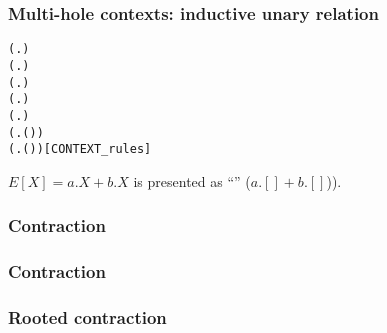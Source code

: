 \begin{frame}[fragile]
\frametitle{Multi-hole contexts: inductive unary relation}
\vspace{-2ex}
\begin{definition}
\begin{alltt}
 (\HOLTokenLambda{}. )
 (\HOLTokenLambda{}. )
  \HOLSymConst{\HOLTokenImp{}}  (\HOLTokenLambda{}.  )
  \HOLSymConst{\HOLTokenConj{}}   \HOLSymConst{\HOLTokenImp{}}  (\HOLTokenLambda{}.   \HOLSymConst{\ensuremath{+}}  )
  \HOLSymConst{\HOLTokenConj{}}   \HOLSymConst{\HOLTokenImp{}}  (\HOLTokenLambda{}.   \HOLSymConst{\ensuremath{\parallel}}  )
  \HOLSymConst{\HOLTokenImp{}}  (\HOLTokenLambda{}. \HOLSymConst{\ensuremath{\nu}}  ( ))
  \HOLSymConst{\HOLTokenImp{}}  (\HOLTokenLambda{}.  ( ) )\hfill{[CONTEXT_rules]}
\end{alltt}
\end{definition}
\begin{examples}
$E[X] = a.X + b.X$ is presented as ``'' ($a.[] + b.[]$)).
\end{examples}
\end{frame}

\begin{frame}[fragile]
\frametitle{Contraction}

\end{frame}

\begin{frame}[fragile]
\frametitle{Contraction}

\end{frame}

\begin{frame}[fragile]
\frametitle{Rooted contraction}
\end{frame}
